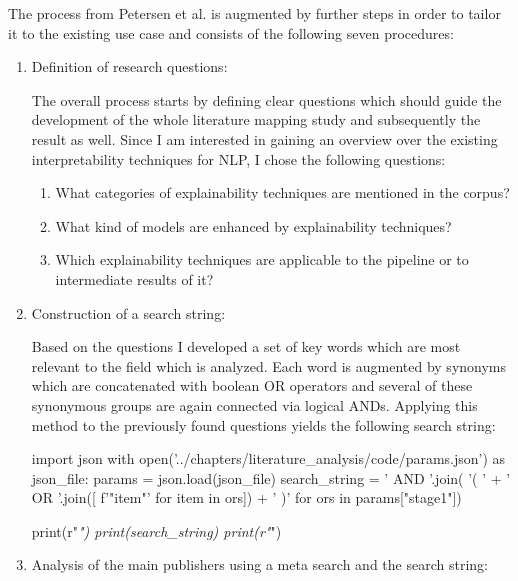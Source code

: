 The process from Petersen et al. is augmented by further steps in order to tailor it to the existing use case and consists of the following seven procedures:
\begin{enumerate}
	
	\item Definition of research questions:
	
	The overall process starts by defining clear questions which should guide the development of the whole literature mapping study and subsequently the result as well. Since I am interested in gaining an overview over the existing interpretability techniques for NLP, I chose the following questions:
	
	\begin{enumerate}
		\item What categories of explainability techniques are mentioned in the corpus?
		\item What kind of models are enhanced by explainability techniques?
		\item Which explainability techniques are applicable to the pipeline or to intermediate results of it?
	\end{enumerate}
	
	\item Construction of a search string:
	
	Based on the questions I developed a set of key words which are most relevant to the field which is analyzed. Each word is augmented by synonyms which are concatenated with boolean OR operators and several of these synonymous groups are again connected via logical ANDs. Applying this method to the previously found questions yields the following search string:
	
\begin{pycode}
import json
with open('../chapters/literature_analysis/code/params.json') as json_file:
	params = json.load(json_file)
	search_string = ' AND '.join( '( ' + ' OR '.join([ f'"{item}"' for item in ors]) + ' )' for ors in params["stage1"])
	
	print(r"\textit{")
	print(search_string)
	print(r"}")
\end{pycode}
	
	
	\item Analysis of the main publishers using a meta search and the search string:
	

\end{enumerate}
